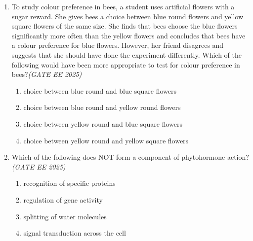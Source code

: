 \begin{enumerate}[leftmargin=*,label=\textbf{Q.\arabic*},resume]

\item To study colour preference in bees, a student uses artificial flowers with a sugar reward. She gives bees a choice between blue round flowers and yellow square flowers of the same size. She finds that bees choose the blue flowers significantly more often than the yellow flowers and concludes that bees have a colour preference for blue flowers. However, her friend disagrees and suggests that she should have done the experiment differently. Which of the following would have been more appropriate to test for colour preference in bees?\hfill \textit{(GATE EE 2025)}
\begin{multicols}{2}
\begin{enumerate}[label=(\Alph*)]
\item choice between blue round and blue square flowers
\item choice between blue round and yellow round flowers
\item choice between yellow round and blue square flowers
\item choice between yellow round and yellow square flowers
\end{enumerate}
\end{multicols}

\item Which of the following does NOT form a component of phytohormone action?\hfill \textit{(GATE EE 2025)}
\begin{multicols}{2}
\begin{enumerate}[label=(\Alph*)]
\item recognition of specific proteins
\item regulation of gene activity
\item splitting of water molecules
\item signal transduction across the cell
\end{enumerate}
\end{multicols}


\end{enumerate}
